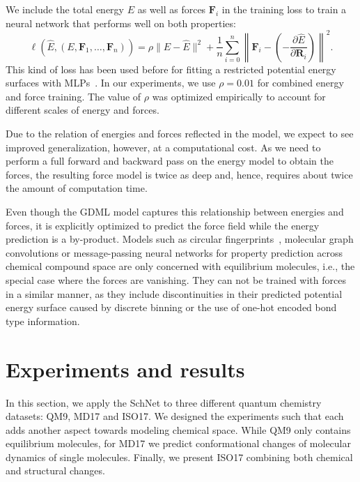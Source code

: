 \documentclass{article}
\newcommand{\R}{\mathbf{R}}
\begin{document}
We include the total energy $E$ as well as forces $\mathbf{F}_i$ in the training loss to train a neural network that performs well on both properties:
\begin{equation}
\ell(\hat{E}, (E, \mathbf{F}_1, \dots, \mathbf{F}_n)) = \rho \|E - \hat{E} \|^2 + \frac{1}{n} \sum_{i=0}^n \left \| \mathbf{F}_i - \left (-\frac{\partial \hat{E}}{\partial \R_i}\right ) \right\|^2. \label{eq:loss}
\end{equation}
This kind of loss has been used before for fitting a restricted potential energy surfaces with MLPs~\citep{pukrittayakamee2009simultaneous}.
In our experiments, we use $\rho=0.01$ for combined energy and force training. The value of $\rho$ was optimized empirically to account for different scales of energy and forces.

Due to the relation of energies and forces reflected in the model, we expect to see improved generalization, however, at a computational cost.
As we need to perform a full forward and backward pass on the energy model to obtain the forces, the resulting force model is twice as deep and, hence, requires about twice the amount of computation time.

Even though the GDML model captures this relationship between energies and forces, it is explicitly optimized to predict the force field while the energy prediction is a by-product.
Models such as circular fingerprints~\citep{duvenaud2015convolutional}, molecular graph convolutions or message-passing neural networks\citep{gilmer2017neural} for property prediction across chemical compound space are only concerned with equilibrium molecules, i.e., the special case where the forces are vanishing.
They can not be trained with forces in a similar manner, as they include discontinuities in their predicted potential energy surface caused by discrete binning or the use of one-hot encoded bond type information.

\section{Experiments and results}
In this section, we apply the SchNet to three different quantum chemistry datasets: QM9, MD17 and ISO17.
We designed the experiments such that each adds another aspect towards modeling chemical space.
While QM9 only contains equilibrium molecules, for MD17 we predict conformational changes of molecular dynamics of single molecules.
Finally, we present ISO17 combining both chemical and structural changes.
\end{document}
